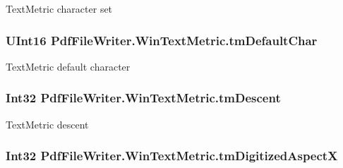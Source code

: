 Text\+Metric character set 

\subsubsection[{\texorpdfstring{tm\+Default\+Char}{tmDefaultChar}}]{\setlength{\rightskip}{0pt plus 5cm}U\+Int16 Pdf\+File\+Writer.\+Win\+Text\+Metric.\+tm\+Default\+Char\hspace{0.3cm}{\ttfamily [get]}}\hypertarget{class_pdf_file_writer_1_1_win_text_metric_a5365b2a93c5f5c4589cbefa5d0e00bdf}{}\label{class_pdf_file_writer_1_1_win_text_metric_a5365b2a93c5f5c4589cbefa5d0e00bdf}


Text\+Metric default character 

\subsubsection[{\texorpdfstring{tm\+Descent}{tmDescent}}]{\setlength{\rightskip}{0pt plus 5cm}Int32 Pdf\+File\+Writer.\+Win\+Text\+Metric.\+tm\+Descent\hspace{0.3cm}{\ttfamily [get]}}\hypertarget{class_pdf_file_writer_1_1_win_text_metric_a51fedd077b2f079bfdc1272b63f97b13}{}\label{class_pdf_file_writer_1_1_win_text_metric_a51fedd077b2f079bfdc1272b63f97b13}


Text\+Metric descent 

\subsubsection[{\texorpdfstring{tm\+Digitized\+AspectX}{tmDigitizedAspectX}}]{\setlength{\rightskip}{0pt plus 5cm}Int32 Pdf\+File\+Writer.\+Win\+Text\+Metric.\+tm\+Digitized\+AspectX\hspace{0.3cm}{\ttfamily [get]}}\hypertarget{class_pdf_file_writer_1_1_win_text_metric_ab5d8d71b1b83243466b2bc74d4ef5340}{}\label{class_pdf_file_writer_1_1_win_text_metric_ab5d8d71b1b83243466b2bc74d4ef5340}


